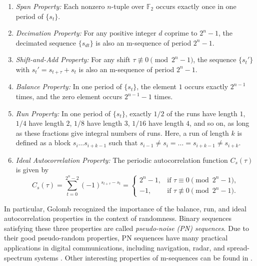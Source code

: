 \documentclass[hidelinks,onefignum,onetabnum]{siamart251216}
\theoremstyle{definition}
\theoremstyle{remark}
\begin{document}
\begin{enumerate}
	\item \textit{Span Property:} Each nonzero $n$-tuple over $\mathbb{F}_2$ occurs exactly once in one period of $\{s_t\}$.
	
	\item \textit{Decimation Property:} For any positive integer $d$ coprime to $2^n-1$, the decimated sequence $\{s_{dt}\}$ is also an m-sequence of period $2^n-1$.
	
	\item \textit{Shift-and-Add Property:} For any shift $\tau \not\equiv 0 \pmod{2^n-1}$, the sequence $\{s_t'\}$ with $s_t' = s_{t+\tau} + s_t$ is also an m-sequence of period $2^n-1$.
	
	\item \textit{Balance Property:} In one period of $\{s_t\}$, the element $1$ occurs exactly $2^{n-1}$ times, and the zero element occurs $2^{n-1}-1$ times.
	
	\item \textit{Run Property:} In one period of $\{s_t\}$, exactly $1/2$ of the runs have length $1$, $1/4$ have length $2$, $1/8$ have length $3$, $1/16$ have length $4$, and so on, as long as these fractions give integral numbers of runs. Here, a run of length $k$ is defined as a block $s_i \dots s_{i+k-1}$ such that $s_{i-1} \neq s_i = \dots = s_{i+k-1} \neq s_{i+k}$.
	
	\item \textit{Ideal Autocorrelation Property:} The periodic autocorrelation function $C_s(\tau)$ is given by
	\begin{equation*}
		C_s(\tau) = \sum_{t=0}^{2^n-2} (-1)^{s_{t+\tau} - s_t} = 
		\begin{cases} 
			2^n - 1, & \text{if } \tau \equiv 0 \pmod{2^n-1}, \\ 
			-1, & \text{if } \tau \not\equiv 0 \pmod{2^n-1}. 
		\end{cases}
	\end{equation*}
\end{enumerate}

In particular, Golomb recognized the importance of the balance, run, and ideal autocorrelation properties in the context of randomness. Binary sequences satisfying these three properties are called \textit{pseudo-noise (PN) sequences}. Due to their good pseudo-random properties, PN sequences have many practical applications in digital communications, including navigation, radar, and spread-spectrum systems \cite{Helleseth Li 2021}. Other interesting properties of m-sequences can be found in \cite{Golomb 1967,Helleseth 1976,Trachtenberg 1970}.
\end{document}
